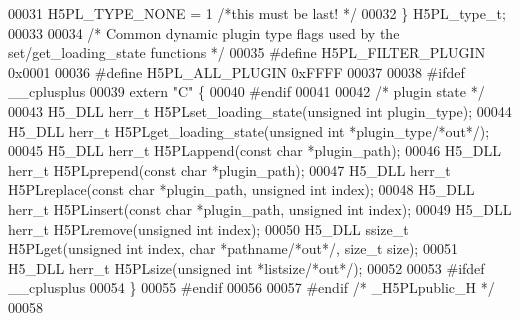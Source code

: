 \begin{DoxyCode}
00031     H5PL\_TYPE\_NONE         = 1    \textcolor{comment}{/*this must be last!       */}
00032 \} H5PL\_type\_t;
00033 
00034 \textcolor{comment}{/* Common dynamic plugin type flags used by the set/get\_loading\_state functions */}
00035 \textcolor{preprocessor}{#define H5PL\_FILTER\_PLUGIN 0x0001}
00036 \textcolor{preprocessor}{#define H5PL\_ALL\_PLUGIN 0xFFFF}
00037 
00038 \textcolor{preprocessor}{#ifdef \_\_cplusplus}
00039 \textcolor{keyword}{extern} \textcolor{stringliteral}{"C"} \{
00040 \textcolor{preprocessor}{#endif}
00041 
00042 \textcolor{comment}{/* plugin state */}
00043 H5\_DLL herr\_t H5PLset\_loading\_state(\textcolor{keywordtype}{unsigned} \textcolor{keywordtype}{int} plugin\_type);
00044 H5\_DLL herr\_t H5PLget\_loading\_state(\textcolor{keywordtype}{unsigned} \textcolor{keywordtype}{int} *plugin\_type\textcolor{comment}{/*out*/});
00045 H5\_DLL herr\_t H5PLappend(\textcolor{keyword}{const} \textcolor{keywordtype}{char} *plugin\_path);
00046 H5\_DLL herr\_t H5PLprepend(\textcolor{keyword}{const} \textcolor{keywordtype}{char} *plugin\_path);
00047 H5\_DLL herr\_t H5PLreplace(\textcolor{keyword}{const} \textcolor{keywordtype}{char} *plugin\_path, \textcolor{keywordtype}{unsigned} \textcolor{keywordtype}{int} index);
00048 H5\_DLL herr\_t H5PLinsert(\textcolor{keyword}{const} \textcolor{keywordtype}{char} *plugin\_path, \textcolor{keywordtype}{unsigned} \textcolor{keywordtype}{int} index);
00049 H5\_DLL herr\_t H5PLremove(\textcolor{keywordtype}{unsigned} \textcolor{keywordtype}{int} index);
00050 H5\_DLL ssize\_t H5PLget(\textcolor{keywordtype}{unsigned} \textcolor{keywordtype}{int} index, \textcolor{keywordtype}{char} *pathname\textcolor{comment}{/*out*/}, \textcolor{keywordtype}{size\_t} size);
00051 H5\_DLL herr\_t H5PLsize(\textcolor{keywordtype}{unsigned} \textcolor{keywordtype}{int} *listsize\textcolor{comment}{/*out*/});
00052 
00053 \textcolor{preprocessor}{#ifdef \_\_cplusplus}
00054 \}
00055 \textcolor{preprocessor}{#endif}
00056 
00057 \textcolor{preprocessor}{#endif }\textcolor{comment}{/* \_H5PLpublic\_H */}\textcolor{preprocessor}{}
00058 
\end{DoxyCode}
